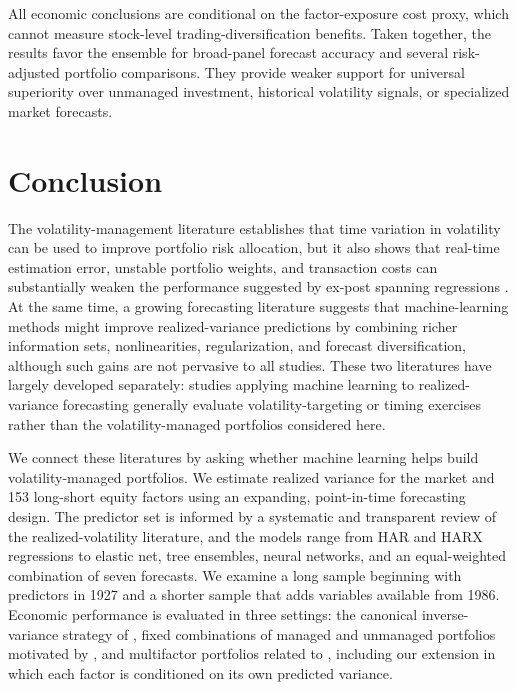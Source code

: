 \documentclass[preprint,12pt,authoryear]{elsarticle}
\begin{document}
All economic conclusions are conditional on the factor-exposure cost proxy, which cannot measure stock-level trading-diversification benefits. Taken together, the results favor the ensemble for broad-panel forecast accuracy and several risk-adjusted portfolio comparisons. They provide weaker support for universal superiority over unmanaged investment, historical volatility signals, or specialized market forecasts.


\section{Conclusion}
\label{sec:conclusion}

The volatility-management literature establishes that time variation in volatility can be used to improve portfolio risk allocation, but it also shows that real-time estimation error, unstable portfolio weights, and transaction costs can substantially weaken the performance suggested by ex-post spanning regressions \citep{moreiramuir2017, cederburg2020, barrosodetzel2021, demiguelmartinutrerauppal2024}. At the same time, a growing forecasting literature suggests that machine-learning methods might improve realized-variance predictions by combining richer information sets, nonlinearities, regularization, and forecast diversification, although such gains are not pervasive to all studies. These two literatures have largely developed separately: studies applying machine learning to realized-variance forecasting generally evaluate volatility-targeting or timing exercises rather than the volatility-managed portfolios considered here.

We connect these literatures by asking whether machine learning helps build volatility-managed portfolios. We estimate realized variance for the market and 153 long-short equity factors using an expanding, point-in-time forecasting design. The predictor set is informed by a systematic and transparent review of the realized-volatility literature, and the models range from HAR and HARX regressions to elastic net, tree ensembles, neural networks, and an equal-weighted combination of seven forecasts. We examine a long sample beginning with predictors in 1927 and a shorter sample that adds variables available from 1986. Economic performance is evaluated in three settings: the canonical inverse-variance strategy of \citet{moreiramuir2017}, fixed combinations of managed and unmanaged portfolios motivated by \citet{cederburg2020}, and multifactor portfolios related to \citet{demiguelmartinutrerauppal2024}, including our extension in which each factor is conditioned on its own predicted variance.
\end{document}
